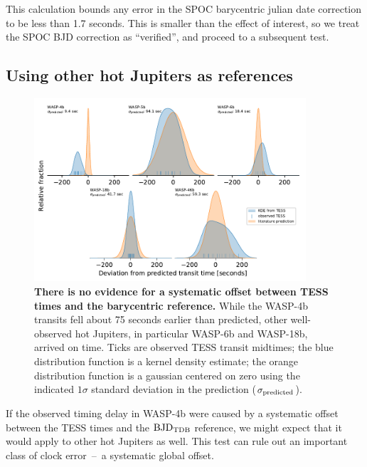 \documentclass[12pt,twocolumn,tighten]{aastex62}
\begin{document}
This calculation bounds any error in the SPOC barycentric julian date
correction to be less than 1.7 seconds.  This is smaller than the
effect of interest, so we treat the SPOC BJD correction as
``verified'', and proceed to a subsequent test.


\subsection{Using other hot Jupiters as references}
\label{sec:hj_verification}

\begin{figure}[ht!]
  \begin{center}
    \leavevmode
    \includegraphics[width=0.9\textwidth]{f6.pdf}
  \end{center}
  \vspace{-0.5cm}
  \caption{
    {\bf There is no evidence for a systematic offset between TESS
    times and the barycentric reference.}
    While the WASP-4b transits fell about 75 seconds earlier than
    predicted, other well-observed hot Jupiters, in particular WASP-6b
    and WASP-18b, arrived on time.  Ticks are observed TESS transit
    midtimes; the blue distribution function is a kernel density
    estimate; the orange distribution function is a gaussian centered
    on zero using the indicated $1\sigma$ standard deviation in the
    prediction
    ($\sigma_{\rm predicted}$).
    \label{fig:hjs}
  }
\end{figure}

If the observed timing delay in WASP-4b were caused by a systematic
offset between the TESS times and the ${\rm
BJD}_{\rm TDB}$ reference, we might expect that it would apply to
other hot Jupiters as well.  This test can rule out an important class
of clock error~--~a systematic global offset.
\end{document}
